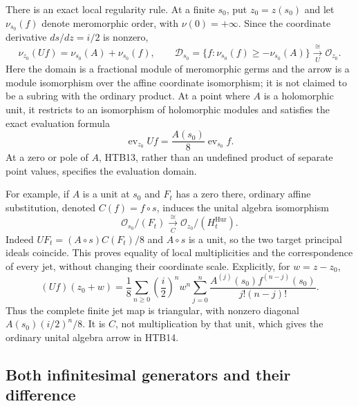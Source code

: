There is an exact local regularity rule. At a finite $s_0$, put
$z_0=z(s_0)$ and let $\nu_{s_0}(f)$ denote meromorphic order, with
$\nu(0)=+\infty$. Since the coordinate derivative $ds/dz=i/2$ is
nonzero,
\begin{equation}\tag{HTB13}
 \nu_{z_0}(Uf)=\nu_{s_0}(A)+\nu_{s_0}(f),\qquad
 \mathcal D_{s_0}
 =\{f:\nu_{s_0}(f)\ge-\nu_{s_0}(A)\}
 \xrightarrow[\;U\;]{\ \cong\ }\mathcal O_{z_0}.
\end{equation}
Here the domain is a fractional module of meromorphic germs and the
arrow is a module isomorphism over the affine coordinate isomorphism;
it is not claimed to be a subring with the ordinary product. At a point
where $A$ is a holomorphic unit, it restricts to an isomorphism of
holomorphic modules and satisfies the exact evaluation formula
\[
 \operatorname{ev}_{z_0}Uf
   =\frac{A(s_0)}8\operatorname{ev}_{s_0}f.
\]
At a zero or pole of $A$, HTB13, rather than an undefined product of
separate point values, specifies the evaluation domain.

For example, if $A$ is a unit at $s_0$ and $F_t$ has a zero there,
ordinary affine substitution, denoted $C(f)=f\circ s$, induces the
unital algebra isomorphism
\begin{equation}\tag{HTB14}
 \mathcal O_{s_0}/(F_t)
 \xrightarrow[\;C\;]{\ \cong\ }
 \mathcal O_{z_0}/(H_t^{\mathrm{Hur}}).
\end{equation}
Indeed $U F_t=(A\circ s)C(F_t)/8$ and $A\circ s$ is a unit, so the
two target principal ideals coincide. This proves equality of local
multiplicities and the correspondence of every jet, without changing
their coordinate scale. Explicitly, for $w=z-z_0$,
\[
 (Uf)(z_0+w)=\frac18\sum_{n\ge0}
       \left(\frac{i}{2}\right)^n w^n
       \sum_{j=0}^n\frac{A^{(j)}(s_0)f^{(n-j)}(s_0)}{j!(n-j)!}.
\]
Thus the complete finite jet map is triangular, with nonzero diagonal
$A(s_0)(i/2)^n/8$. It is $C$, not multiplication by that unit, which
gives the ordinary unital algebra arrow in HTB14.

\subsection{Both infinitesimal generators and their difference}

